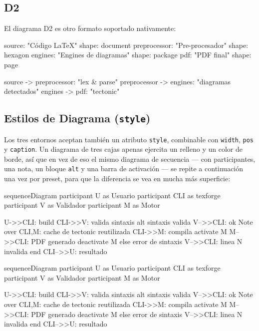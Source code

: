 \documentclass[a4paper,12pt]{article}
\begin{document}
  \subsection{D2}

  El diagrama D2 es otro formato soportado nativamente:

  \begin{d2}[caption=Pipeline de renderizado, height=14cm, pos=t]
    source: "Código LaTeX" {
      shape: document
    }
    preprocessor: "Pre-procesador" {
      shape: hexagon
    }
    engines: "Engines de diagramas" {
      shape: package
    }
    pdf: "PDF final" {
      shape: page
    }

    source -> preprocessor: "lex & parse"
    preprocessor -> engines: "diagramas detectados"
    engines -> pdf: "tectonic"
  \end{d2}

  \clearpage
  \subsection{Estilos de Diagrama (\texttt{style})}\label{sec:estilos}

  Los tres entornos aceptan también un atributo \texttt{style}, combinable
  con \texttt{width}, \texttt{pos} y \texttt{caption}. Un diagrama de tres
  cajas apenas ejercita un relleno y un color de borde, así que en vez de
  eso el mismo diagrama de secuencia --- con participantes, una nota, un
  bloque \texttt{alt} y una barra de activación --- se repite a
  continuación una vez por preset, para que la diferencia se vea en mucha
  más superficie:

  \begin{mermaid}[style=editorial, width=0.85\linewidth, caption={Preset \texttt{editorial}: participantes y nota en tono papel con tinta oscura; el acento vermellón vive solo en las flechas de mensaje, nunca en el relleno de una caja}, pos=H]
    sequenceDiagram
    participant U as Usuario
    participant CLI as texforge
    participant V as Validador
    participant M as Motor

    U->>CLI: build
    CLI->>V: valida sintaxis
    alt sintaxis valida
    V-->>CLI: ok
    Note over CLI,M: cache de tectonic reutilizada
    CLI->>M: compila
    activate M
    M-->>CLI: PDF generado
    deactivate M
    else error de sintaxis
    V-->>CLI: linea N invalida
    end
    CLI-->>U: resultado
  \end{mermaid}

  \begin{mermaid}[style=monochrome, width=0.85\linewidth, caption={Preset \texttt{monochrome}: el mismo diagrama sin un solo color, apto para impresión en blanco y negro}, pos=H]
    sequenceDiagram
    participant U as Usuario
    participant CLI as texforge
    participant V as Validador
    participant M as Motor

    U->>CLI: build
    CLI->>V: valida sintaxis
    alt sintaxis valida
    V-->>CLI: ok
    Note over CLI,M: cache de tectonic reutilizada
    CLI->>M: compila
    activate M
    M-->>CLI: PDF generado
    deactivate M
    else error de sintaxis
    V-->>CLI: linea N invalida
    end
    CLI-->>U: resultado
  \end{mermaid}
\end{document}
